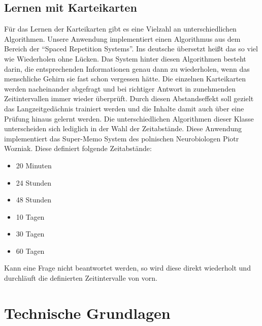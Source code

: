 \subsection{Lernen mit Karteikarten}
Für das Lernen der Karteikarten gibt es eine Vielzahl an unterschiedlichen Algorithmen. Unsere Anwendung implementiert einen Algorithmus aus dem Bereich der \enquote{Spaced Repetition Systems}. Ins deutsche übersetzt heißt das so viel wie Wiederholen ohne Lücken. Das System hinter diesen Algorithmen besteht darin, die entsprechenden Informationen genau dann zu wiederholen, wenn das menschliche Gehirn sie fast schon vergessen hätte.\autocite[Vgl.][]{Tabibian3988} Die einzelnen Karteikarten werden nacheinander abgefragt und bei richtiger Antwort in zunehmenden Zeitintervallen immer wieder überprüft. Durch diesen Abstandseffekt soll gezielt das Langzeitgedächnis trainiert werden und die Inhalte damit auch über eine Prüfung hinaus gelernt werden. Die unterschiedlichen Algorithmen dieser Klasse unterscheiden sich lediglich in der Wahl der Zeitabstände. Diese Anwendung implementiert das Super-Memo System des polnischen Neurobiologen Piotr Wozniak. Diese definiert folgende Zeitabstände:
\begin{itemize}
	\item 20 Minuten
	\item 24 Stunden
	\item 48 Stunden
	\item 10 Tagen
	\item 30 Tagen
	\item 60 Tagen
\end{itemize}  
Kann eine Frage nicht beantwortet werden, so wird diese direkt wiederholt und durchläuft die definierten Zeitintervalle von vorn. \autocite[Vgl.][]{BaileyuDavey}



\section{Technische Grundlagen}

